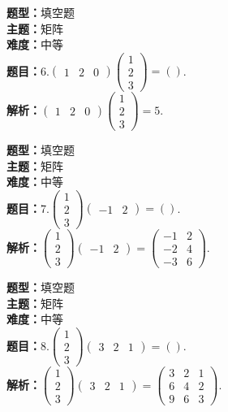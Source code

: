 \documentclass{ctexart}
\newenvironment{question}[5]{%
	\noindent\textbf{题型：}#1\\
	\textbf{主题：}#2\\
	\textbf{难度：}#3\\
	\textbf{题目：}#4\\
	\textbf{解析：}#5\\
	\vspace{1em}
}{}
\begin{document}
	\begin{question}
		{填空题}
		{矩阵}
		{中等}
		{6.\(\left(\begin{array}{lll}1 & 2 & 0\end{array}\right)\left(\begin{array}{l}1 \\ 2 \\ 3\end{array}\right)=()\).}
		{\(\left(\begin{array}{lll}1 & 2 & 0\end{array}\right)\left(\begin{array}{l}1 \\ 2 \\ 3\end{array}\right)=5\).}
	\end{question}
	
	\begin{question}
		{填空题}
		{矩阵}
		{中等}
		{7.\(\left(\begin{array}{l}1 \\ 2 \\ 3\end{array}\right)\left(\begin{array}{ll}-1 & 2\end{array}\right)=()\).}
		{\(\left(\begin{array}{l}1 \\ 2 \\ 3\end{array}\right)\left(\begin{array}{ll}-1 & 2\end{array}\right)=\left(\begin{array}{ll}-1 & 2 \\ -2 & 4 \\ -3 & 6\end{array}\right)\).}
	\end{question}
	
	\begin{question}
		{填空题}
		{矩阵}
		{中等}
		{8.\(\left(\begin{array}{l}1 \\ 2 \\ 3\end{array}\right)\left(\begin{array}{lll}3 & 2 & 1\end{array}\right)=()\).}
		{\(\left(\begin{array}{l}1 \\ 2 \\ 3\end{array}\right)\left(\begin{array}{lll}3 & 2 & 1\end{array}\right)=\left(\begin{array}{lll}3 & 2 & 1 \\ 6 & 4 & 2 \\ 9 & 6 & 3\end{array}\right)\).}
	\end{question}
	
\end{document}
